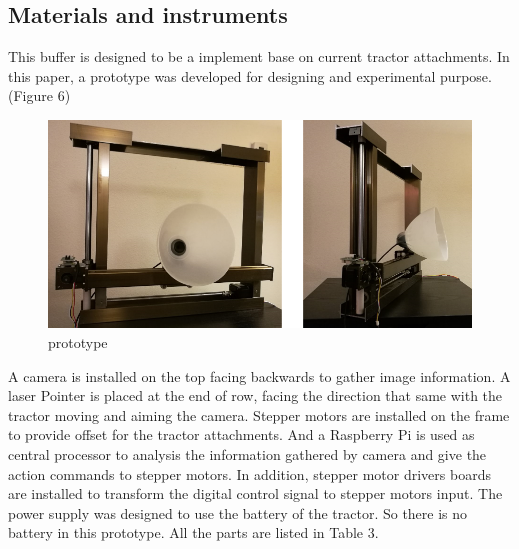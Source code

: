 \documentclass[12pt]{article}
\begin{document}
\begin{flushleft}
\subsection{Materials and instruments}
This buffer is designed to be a implement base on current tractor attachments. In this paper, a prototype was developed for designing and experimental purpose. (Figure 6) 
\begin{figure}[ht!]
	\begin{center}
		\includegraphics[scale = 0.6]{prototype.png}
		\caption{prototype}
	\end{center}
\end{figure}
A camera is installed on the top facing backwards to gather image information. A laser Pointer is placed at the end of row, facing the direction that same with the tractor moving and aiming the camera. Stepper motors are installed on the frame to provide offset for the tractor attachments. And a Raspberry Pi is used as central processor to analysis the information gathered by camera and give the action commands to stepper motors. In addition, stepper motor drivers boards are installed to transform the digital control signal to stepper motors input. The power supply was designed to use the battery of the tractor. So there is no battery in this prototype. All the parts are listed in Table 3.


\end{flushleft}
\end{document}
